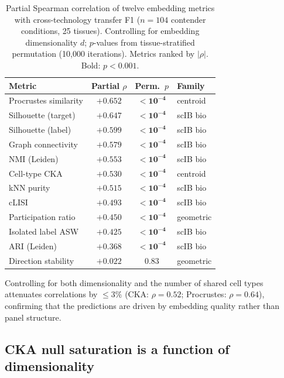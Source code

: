 \documentclass[11pt]{article}
\begin{document}
\begin{table}[t]
\centering
\caption{Partial Spearman correlation of twelve embedding metrics with
cross-technology transfer F1 ($n = 104$ contender conditions, 25
tissues). Controlling for embedding dimensionality $d$; $p$-values from
tissue-stratified permutation (10,000 iterations). Metrics ranked by
$|\rho|$. Bold: $p < 0.001$.}
\label{tab:metrics}
\small
\begin{tabular}{@{}lccl@{}}
\toprule
Metric & Partial $\rho$ & Perm.\ $p$ & Family \\
\midrule
Procrustes similarity   & $+0.652$ & $\mathbf{< 10^{-4}}$ & centroid \\
Silhouette (target)     & $+0.647$ & $\mathbf{< 10^{-4}}$ & scIB bio \\
Silhouette (label)      & $+0.599$ & $\mathbf{< 10^{-4}}$ & scIB bio \\
Graph connectivity      & $+0.579$ & $\mathbf{< 10^{-4}}$ & scIB bio \\
NMI (Leiden)            & $+0.553$ & $\mathbf{< 10^{-4}}$ & scIB bio \\
Cell-type CKA           & $+0.530$ & $\mathbf{< 10^{-4}}$ & centroid \\
kNN purity              & $+0.515$ & $\mathbf{< 10^{-4}}$ & scIB bio \\
cLISI                   & $+0.493$ & $\mathbf{< 10^{-4}}$ & scIB bio \\
Participation ratio     & $+0.450$ & $\mathbf{< 10^{-4}}$ & geometric \\
Isolated label ASW      & $+0.425$ & $\mathbf{< 10^{-4}}$ & scIB bio \\
ARI (Leiden)            & $+0.368$ & $\mathbf{< 10^{-4}}$ & scIB bio \\
Direction stability     & $+0.022$ & $0.83$               & geometric \\
\bottomrule
\end{tabular}
\end{table}

Controlling for both dimensionality and the number of shared cell types
attenuates correlations by $\leq 3\%$ (CKA: $\rho = 0.52$; Procrustes:
$\rho = 0.64$), confirming that the predictions are driven by embedding
quality rather than panel structure.


\subsection{CKA null saturation is a function of dimensionality}
\label{sec:nullfloor}
\end{document}

